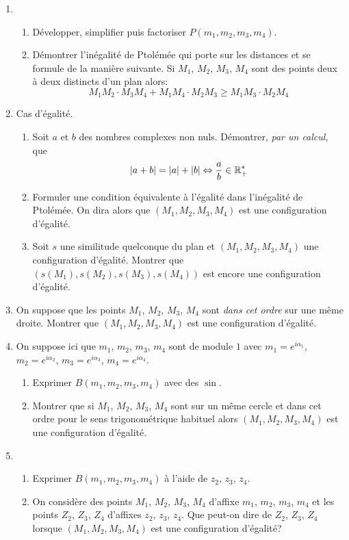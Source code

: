 \begin{enumerate}
 \item 
\begin{enumerate}
\item Développer, simplifier puis factoriser $P(m_1,m_2,m_3,m_4)$.
\item Démontrer l'inégalité de Ptolémée qui porte sur les distances et se formule de la manière suivante.\newline
 Si $M_1$, $M_2$, $M_3$, $M_4$ sont des points deux à deux distincts d'un plan  alors:
\begin{displaymath}
 M_1 M_2\cdot M_3 M_4 + M_1 M_4\cdot M_2 M_3  \geq M_1 M_3\cdot M_2 M_4 
\end{displaymath}
 \end{enumerate}
 \item Cas d'égalité.
\begin{enumerate}
 \item Soit $a$ et $b$ des nombres complexes non nuls. Démontrer, \emph{par un calcul}, que
\begin{displaymath}
 |a+b| = |a| + |b| \Leftrightarrow \frac{a}{b} \in \mathbb{R}_+^*
\end{displaymath}
\item Formuler une condition équivalente à l'égalité dans l'inégalité de Ptolémée. On dira alors que $(M_1,M_2,M_3,M_4)$ est une configuration d'égalité.
\item Soit $s$ une similitude quelconque du plan et $(M_1,M_2,M_3,M_4)$ une configuration d'égalité. Montrer que $(s(M_1),s(M_2), s(M_3),s(M_4))$ est encore une configuration d'égalité.
\end{enumerate}
\item On suppose que les points $M_1$, $M_2$, $M_3$, $M_4$ sont \emph{dans cet ordre} sur une même droite. Montrer que $(M_1,M_2,M_3,M_4)$ est une configuration d'égalité.

\item On suppose ici que $m_1$, $m_2$, $m_3$, $m_4$ sont de module $1$ avec $m_1=e^{i\alpha_1}$, $m_2=e^{i\alpha_2}$, $m_3=e^{i\alpha_3}$, $m_4=e^{i\alpha_4}$.
\begin{enumerate}
 \item Exprimer $B(m_1,m_2,m_3,m_4)$ avec des $\sin$.
 \item Montrer que si $M_1$, $M_2$, $M_3$, $M_4$ sont sur un même cercle et dans cet ordre pour le sens trigonométrique habituel alors $(M_1,M_2,M_3,M_4)$ est une configuration d'égalité.
\end{enumerate}
\item \begin{enumerate}
\item Exprimer $B(m_1,m_2,m_3,m_4)$ à l'aide de $z_2$, $z_3$, $z_4$.
\item On considère des points $M_1$, $M_2$, $M_3$, $M_4$ d'affixe $m_1$, $m_2$, $m_3$, $m_4$ et les points $Z_2$, $Z_3$, $Z_4$ d'affixes $z_2$, $z_3$, $z_4$. Que peut-on dire de $Z_2$, $Z_3$, $Z_4$ lorsque $(M_1,M_2,M_3,M_4)$ est une configuration d'égalité?
\end{enumerate}
\end{enumerate}
